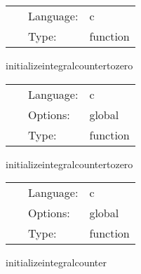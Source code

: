 \hspace{5mm}{\it create directory for file output. } 


\hspace{5mm}

 \begin{tabular*}{160mm}{cll} 
~ & Language:  & c \\ 
~ & Type:  & function \\ 
\end{tabular*} 


\vspace{5mm}


\hspace{5mm} initializeintegralcountertozero 

\hspace{5mm}{\it initialize integralcounter variable to zero } 


\hspace{5mm}

 \begin{tabular*}{160mm}{cll} 
~ & Language:  & c \\ 
~ & Options:  & global \\ 
~ & Type:  & function \\ 
\end{tabular*} 


\vspace{5mm}


\hspace{5mm} initializeintegralcountertozero 

\hspace{5mm}{\it initialize integralcounter variable to zero } 


\hspace{5mm}

 \begin{tabular*}{160mm}{cll} 
~ & Language:  & c \\ 
~ & Options:  & global \\ 
~ & Type:  & function \\ 
\end{tabular*} 


\vspace{5mm}


\hspace{5mm} initializeintegralcounter 

